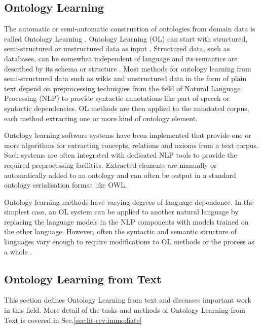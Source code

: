 \documentclass[a4paper]{report}
\newcommand{\todo}[1]{}
\begin{document}
\subsection{Ontology Learning}
\label{sec:background:ontlearning}

The automatic or semi-automatic construction of ontologies from domain data is called Ontology Learning \cite{Cimiano06}.
Ontology Learning (OL) can start with structured, semi-structured or unstructured data as input \cite{Cimiano2009OL}.
Structured data, such as databases, can be somewhat independent of language and its semantics are described by its schema or structure \todo{I think \cite{Cimiano2009OL} is sufficient but need to check}.
Most methods for ontology learning from semi-structured data such as wikis and unstructured data in the form of plain text depend on preprocessing techniques from the field of Natural Language Processing (NLP) to provide syntactic annotations like part of speech or syntactic dependencies.
OL methods are then applied to the annotated corpus, each method extracting one or more kind of ontology element.

Ontology learning software systems have been implemented that provide one or more algorithms for extracting concepts, relations and axioms from a text corpus.
Such systems are often integrated with dedicated NLP tools to provide the required preprocessing facilities.
Extracted elements are manually or automatically added to an ontology and can often be output in a standard ontology serialisation format like OWL\cite{OWLOverview2004}.

Ontology learning methods have varying degrees of language dependence.
In the simplest case, an OL system can be applied to another natural language by replacing the language models in the NLP components with models trained on the other language.
However, often the syntactic and semantic structure of languages vary enough to require modifications to OL methods or the process as a whole \cite{Voelkner2008Spanish}\todo{saying "often" probably means we need more than one example}.

\subsection{Ontology Learning from Text}
\label{sec:background:ontlearning-text}

This section defines Ontology Learning from text and discusses important work in this field.
More detail of the tasks and methods of Ontology Learning from Text is covered in Sec.\ref{sec:lit-rev:immediate}
\end{document}
